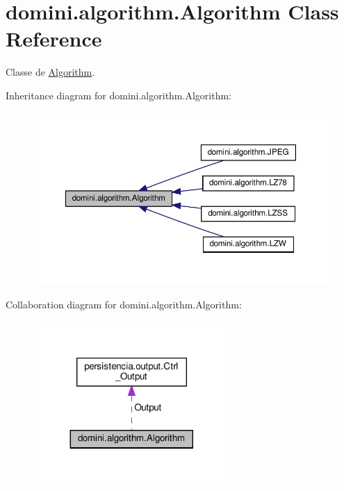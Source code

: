 \hypertarget{classdomini_1_1algorithm_1_1Algorithm}{}\section{domini.\+algorithm.\+Algorithm Class Reference}
\label{classdomini_1_1algorithm_1_1Algorithm}


Classe de \hyperlink{classdomini_1_1algorithm_1_1Algorithm}{Algorithm}.  




Inheritance diagram for domini.\+algorithm.\+Algorithm\+:\nopagebreak
\begin{figure}[H]
\begin{center}
\leavevmode
\includegraphics[width=350pt]{classdomini_1_1algorithm_1_1Algorithm__inherit__graph}
\end{center}
\end{figure}


Collaboration diagram for domini.\+algorithm.\+Algorithm\+:\nopagebreak
\begin{figure}[H]
\begin{center}
\leavevmode
\includegraphics[width=212pt]{classdomini_1_1algorithm_1_1Algorithm__coll__graph}
\end{center}
\end{figure}
